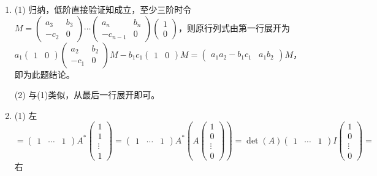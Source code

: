 \documentclass[a4paper,UTF8,fontset=windows]{ctexart}
\begin{document}
\begin{enumerate}
\item
(1) 归纳，低阶直接验证知成立，至少三阶时令$M=\begin{pmatrix}a_3&b_3\\-c_2&0\end{pmatrix}\cdots\begin{pmatrix}a_n&b_n\\-c_{n-1}&0\end{pmatrix}\begin{pmatrix}1\\0\end{pmatrix}$，则原行列式由第一行展开为$a_1\begin{pmatrix}1&0\end{pmatrix}\begin{pmatrix}a_2&b_2\\-c_1&0\end{pmatrix}M-b_1c_1\begin{pmatrix}1&0\end{pmatrix}M=\begin{pmatrix}a_1a_2-b_1c_1&a_1b_2\end{pmatrix}M$，即为此题结论。

(2) 与(1)类似，从最后一行展开即可。

\item
(1) 左$=\begin{pmatrix}1&\cdots&1\end{pmatrix}A^\ast\begin{pmatrix}1\\1\\\vdots\\1\end{pmatrix}=\begin{pmatrix}1&\cdots&1\end{pmatrix}A^\ast\left(A\begin{pmatrix}1\\0\\\vdots\\0\end{pmatrix}\right)=\det(A)\begin{pmatrix}1&\cdots&1\end{pmatrix}I\begin{pmatrix}1\\0\\\vdots\\0\end{pmatrix}=$右


\end{enumerate}
\end{document}
